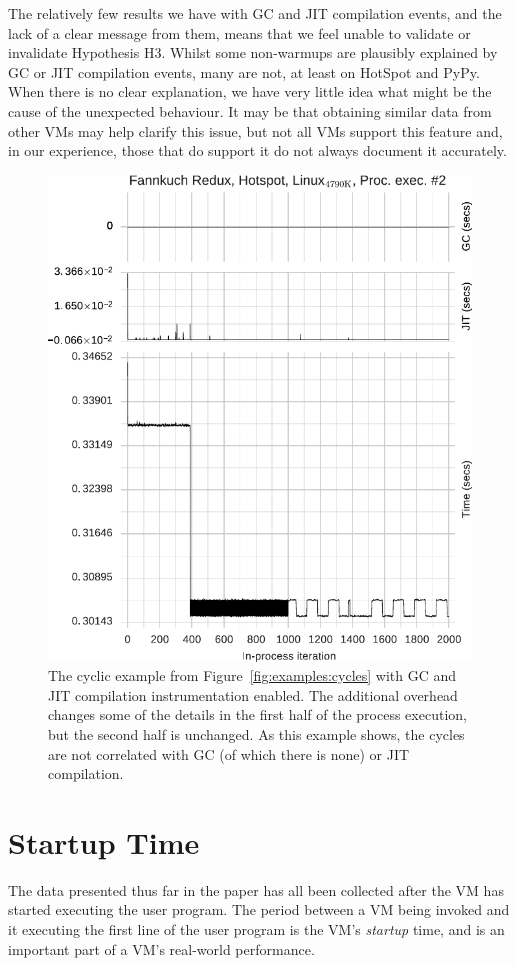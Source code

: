 \documentclass[acmlarge]{acmart}\settopmatter{printfolios=true}
\begin{document}
The relatively few results we have with GC and JIT compilation events, and the lack of a clear
message from them, means that we feel unable to validate or invalidate
Hypothesis H3. Whilst some non-warmups are plausibly explained by GC or JIT compilation events, many are not, at
least on HotSpot and PyPy. When there is no clear explanation, we have very little idea what might be
the cause of the unexpected behaviour. It may be that obtaining similar data
from other VMs may help clarify this issue, but not all VMs support this
feature and, in our experience, those that do support it do not always
document it accurately.

\begin{figure}[tbp]
\centering
\includegraphics[width=.45\textwidth]{examples/new_good_comp.pdf}
\caption{The cyclic example from Figure~\ref{fig:examples:cycles} with
GC and JIT compilation instrumentation enabled. The additional overhead
changes some of the details in the first half of the process
execution, but the second half is unchanged. As this example shows, the
cycles are not correlated with GC (of which there is none) or JIT compilation.}
\label{fig:goodcomp}
\end{figure}

\section{Startup Time}
\label{sec:startup}

The data presented thus far in the paper has all been collected after the VM has
started executing the user program. The period between a VM being
invoked and it executing the first line of the user program is the VM's \emph{startup} time,
and is an important part of a VM's real-world performance.
\end{document}
